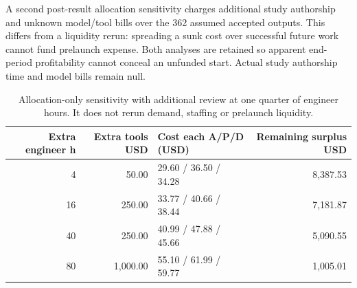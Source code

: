 A second post-result allocation sensitivity charges additional study authorship and unknown model/tool bills over the 362 assumed accepted outputs. This differs from a liquidity rerun: spreading a sunk cost over successful future work cannot fund prelaunch expense. Both analyses are retained so apparent end-period profitability cannot conceal an unfunded start. Actual study authorship time and model bills remain null.
\begin{table}[H]\small\centering\begin{tabular}{rrlr}\toprule
Extra engineer h & Extra tools USD & Cost each A/P/D (USD) & Remaining surplus USD \\\midrule
4 & 50.00 & 29.60 / 36.50 / 34.28 & 8,387.53 \\
16 & 250.00 & 33.77 / 40.66 / 38.44 & 7,181.87 \\
40 & 250.00 & 40.99 / 47.88 / 45.66 & 5,090.55 \\
80 & 1,000.00 & 55.10 / 61.99 / 59.77 & 1,005.01 \\
\bottomrule\end{tabular}\caption{Allocation-only sensitivity with additional review at one quarter of engineer hours. It does not rerun demand, staffing or prelaunch liquidity.}\end{table}

